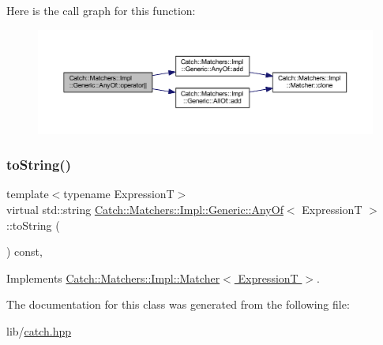 Here is the call graph for this function\+:\nopagebreak
\begin{figure}[H]
\begin{center}
\leavevmode
\includegraphics[width=350pt]{class_catch_1_1_matchers_1_1_impl_1_1_generic_1_1_any_of_a6dc9aee9a816f66ddc9de0c45c1c9ac1_cgraph}
\end{center}
\end{figure}
\hypertarget{class_catch_1_1_matchers_1_1_impl_1_1_generic_1_1_any_of_a331aaf012b133682eadc9ed5342f848a}{}\label{class_catch_1_1_matchers_1_1_impl_1_1_generic_1_1_any_of_a331aaf012b133682eadc9ed5342f848a} 
\subsubsection{\texorpdfstring{to\+String()}{toString()}}
{\footnotesize\ttfamily template$<$typename ExpressionT$>$ \\
virtual std\+::string \hyperlink{class_catch_1_1_matchers_1_1_impl_1_1_generic_1_1_any_of}{Catch\+::\+Matchers\+::\+Impl\+::\+Generic\+::\+Any\+Of}$<$ ExpressionT $>$\+::to\+String (\begin{DoxyParamCaption}{ }\end{DoxyParamCaption}) const\hspace{0.3cm}{\ttfamily [inline]}, {\ttfamily [virtual]}}



Implements \hyperlink{struct_catch_1_1_matchers_1_1_impl_1_1_matcher_a091bcc37e589967d7e10fc7790d820e2}{Catch\+::\+Matchers\+::\+Impl\+::\+Matcher$<$ Expression\+T $>$}.



The documentation for this class was generated from the following file\+:\begin{DoxyCompactItemize}
\item 
lib/\hyperlink{catch_8hpp}{catch.\+hpp}\end{DoxyCompactItemize}
